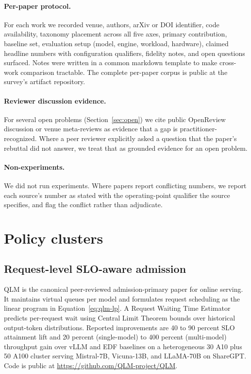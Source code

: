 \paragraph{Per-paper protocol.} For each work we recorded venue,
authors, arXiv or DOI identifier, code availability, taxonomy
placement across all five axes, primary contribution, baseline set,
evaluation setup (model, engine, workload, hardware), claimed headline
numbers with configuration qualifiers, fidelity notes, and open
questions surfaced. Notes were written in a common markdown template
to make cross-work comparison tractable. The complete per-paper corpus
is public at the survey's artifact repository.

\paragraph{Reviewer discussion evidence.} For several open problems
(Section~\ref{sec:open}) we cite public OpenReview discussion or venue
meta-reviews as evidence that a gap is practitioner-recognized. Where
a peer reviewer explicitly asked a question that the paper's rebuttal
did not answer, we treat that as grounded evidence for an open
problem.

\paragraph{Non-experiments.} We did not run experiments. Where papers
report conflicting numbers, we report each source's number as stated
with the operating-point qualifier the source specifies, and flag the
conflict rather than adjudicate.

\section{Policy clusters}
\label{sec:clusters}

\subsection{Request-level SLO-aware admission}

QLM \citep{patke2024qlm} is the canonical peer-reviewed
admission-primary paper for online serving. It maintains virtual
queues per model and formulates request scheduling as the linear
program in Equation~\ref{eq:qlm-lp}. A Request Waiting Time Estimator
predicts per-request wait using Central Limit Theorem bounds over
historical output-token distributions. Reported improvements are 40 to
90 percent SLO attainment lift and 20 percent (single-model) to 400
percent (multi-model) throughput gain over vLLM and EDF baselines on a
heterogeneous 30 A10 plus 50 A100 cluster serving Mistral-7B,
Vicuna-13B, and LLaMA-70B on ShareGPT. Code is public at
\url{https://github.com/QLM-project/QLM}.

